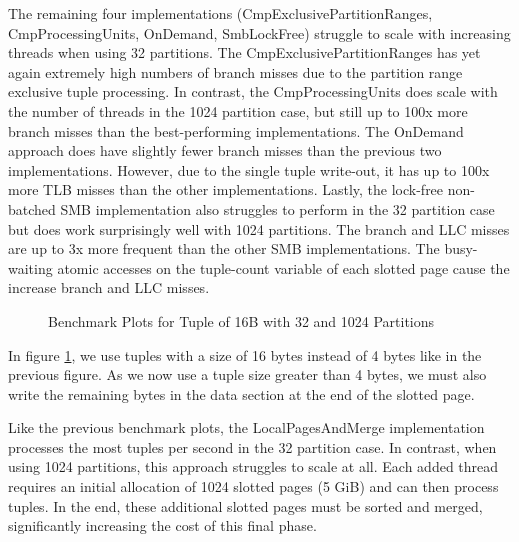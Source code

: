The remaining four implementations (CmpExclusivePartitionRanges, CmpProcessingUnits, OnDemand, Smb\-Lock\-Free) struggle to scale with increasing threads when using 32 partitions.
The CmpExclusivePartitionRanges has yet again extremely high numbers of branch misses due to the partition range exclusive tuple processing.
In contrast, the CmpProcessingUnits does scale with the number of threads in the 1024 partition case, but still up to 100x more branch misses than the best-performing implementations.
The OnDemand approach does have slightly fewer branch misses than the previous two implementations.
However, due to the single tuple write-out, it has up to 100x more \ac{TLB} misses than the other implementations.
Lastly, the lock-free non-batched \ac{SMB} implementation also struggles to perform in the 32 partition case but does work surprisingly well with 1024 partitions.
The branch and LLC misses are up to 3x more frequent than the other \ac{SMB} implementations.
The busy-waiting atomic accesses on the tuple-count variable of each slotted page cause the increase branch and LLC misses.
\begin{figure}[h]
  \centering
  \begin{subfigure}{.49\textwidth}
    \centering
    \resizebox{\linewidth}{!}{}
  \end{subfigure}
  \begin{subfigure}{.49\textwidth}
    \centering
    \resizebox{\linewidth}{!}{}
  \end{subfigure}
  \begin{subfigure}{\textwidth}
    \centering
    \resizebox{\linewidth}{!}{}
  \end{subfigure}
  \caption[Shuffle Benchmark Plots for Tuple of 16B with 32 and 1024 Partitions]{Benchmark Plots for Tuple of 16B with 32 and 1024 Partitions}
  \label{plot-shuffle-16B-32-1024}
\end{figure}

In figure \ref{plot-shuffle-16B-32-1024}, we use tuples with a size of 16 bytes instead of 4 bytes like in the previous figure.
As we now use a tuple size greater than 4 bytes, we must also write the remaining bytes in the data section at the end of the slotted page.

Like the previous benchmark plots, the Local\-Pages\-And\-Merge implementation processes the most tuples per second in the 32 partition case.
In contrast, when using 1024 partitions, this approach struggles to scale at all.
Each added thread requires an initial allocation of 1024 slotted pages (5 GiB) and can then process tuples.
In the end, these additional slotted pages must be sorted and merged, significantly increasing the cost of this final phase.

